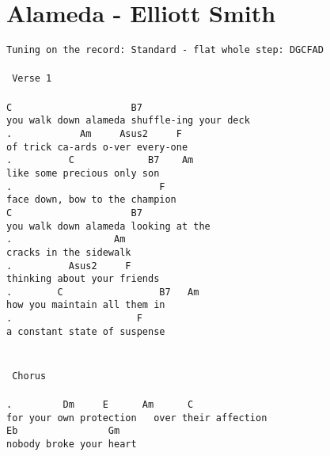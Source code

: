 \newpage
\section{Alameda - Elliott Smith}
\label{Alameda - Elliott Smith}
\texttt{Tuning on the record: Standard - flat whole step: DGCFAD\\
\\
\lbrack\ Verse\ 1\rbrack\\
\\
C\ \ \ \ \ \ \ \ \ \ \ \ \ \ \ \ \ \ \ \ \ B7\ \ \ \ \ \ \ \ \ \ \ \ \ \ \ \ \ \\
you\ walk\ down\ alameda\ shuffle-ing\ your\ deck\\
.\ \ \ \ \ \ \ \ \ \ \ \ Am\ \ \ \ \ Asus2\ \ \ \ \ F\\
of\ trick\ ca-ards\ o-ver\ every-one\\
.\ \ \ \ \ \ \ \ \ \ C\ \ \ \ \ \ \ \ \ \ \ \ \ B7\ \ \ \ Am\\
like\ some\ precious\ only\ son\\
.\ \ \ \ \ \ \ \ \ \ \ \ \ \ \ \ \ \ \ \ \ \ \ \ \ \ F\\
face\ down,\ bow\ to\ the\ champion\\
C\ \ \ \ \ \ \ \ \ \ \ \ \ \ \ \ \ \ \ \ \ B7\\
you\ walk\ down\ alameda\ looking\ at\ the\\
.\ \ \ \ \ \ \ \ \ \ \ \ \ \ \ \ \ \ Am\\
cracks\ in\ the\ sidewalk\\
.\ \ \ \ \ \ \ \ \ \ Asus2\ \ \ \ \ F\\
thinking\ about\ your\ friends\\
.\ \ \ \ \ \ \ \ C\ \ \ \ \ \ \ \ \ \ \ \ \ \ \ \ \ B7\ \ \ Am\\
how\ you\ maintain\ all\ them\ in\\
.\ \ \ \ \ \ \ \ \ \ \ \ \ \ \ \ \ \ \ \ \ \ F\\
a\ constant\ state\ of\ suspense\\
\\
\\
\lbrack\ Chorus\rbrack\\
\\
.\ \ \ \ \ \ \ \ \ Dm\ \ \ \ \ E\ \ \ \ \ \ Am\ \ \ \ \ \ C\ \\
for\ your\ own\ protection\ \ \ over\ their\ affection\\
Eb\ \ \ \ \ \ \ \ \ \ \ \ \ \ \ \ Gm\\
nobody\ broke\ your\ heart\\
}
